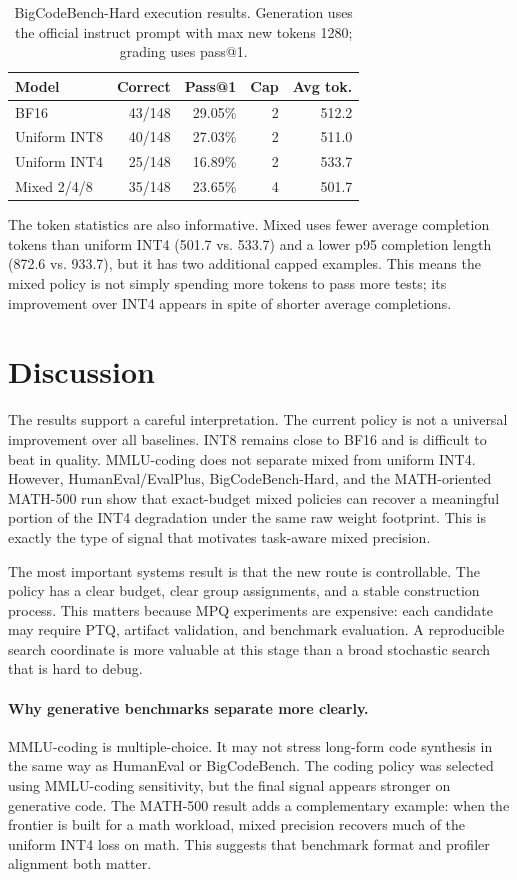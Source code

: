 \documentclass{article}
\begin{document}
\begin{table}[t]
\caption{BigCodeBench-Hard execution results. Generation uses the official instruct prompt with max new tokens 1280; grading uses pass@1.}
\label{tab:bigcodebench}
\centering
\footnotesize
\begin{tabular}{lrrrr}
\toprule
Model & Correct & Pass@1 & Cap & Avg tok. \\
\midrule
BF16 & 43/148 & 29.05\% & 2 & 512.2 \\
Uniform INT8 & 40/148 & 27.03\% & 2 & 511.0 \\
Uniform INT4 & 25/148 & 16.89\% & 2 & 533.7 \\
Mixed 2/4/8 & 35/148 & 23.65\% & 4 & 501.7 \\
\bottomrule
\end{tabular}
\end{table}

The token statistics are also informative. Mixed uses fewer average completion tokens than uniform INT4 (501.7 vs. 533.7) and a lower p95 completion length (872.6 vs. 933.7), but it has two additional capped examples. This means the mixed policy is not simply spending more tokens to pass more tests; its improvement over INT4 appears in spite of shorter average completions.

\section{Discussion}

The results support a careful interpretation. The current policy is not a universal improvement over all baselines. INT8 remains close to BF16 and is difficult to beat in quality. MMLU-coding does not separate mixed from uniform INT4. However, HumanEval/EvalPlus, BigCodeBench-Hard, and the MATH-oriented MATH-500 run show that exact-budget mixed policies can recover a meaningful portion of the INT4 degradation under the same raw weight footprint. This is exactly the type of signal that motivates task-aware mixed precision.

The most important systems result is that the new route is controllable. The policy has a clear budget, clear group assignments, and a stable construction process. This matters because MPQ experiments are expensive: each candidate may require PTQ, artifact validation, and benchmark evaluation. A reproducible search coordinate is more valuable at this stage than a broad stochastic search that is hard to debug.

\paragraph{Why generative benchmarks separate more clearly.}
MMLU-coding is multiple-choice. It may not stress long-form code synthesis in the same way as HumanEval or BigCodeBench. The coding policy was selected using MMLU-coding sensitivity, but the final signal appears stronger on generative code. The MATH-500 result adds a complementary example: when the frontier is built for a math workload, mixed precision recovers much of the uniform INT4 loss on math. This suggests that benchmark format and profiler alignment both matter.
\end{document}

